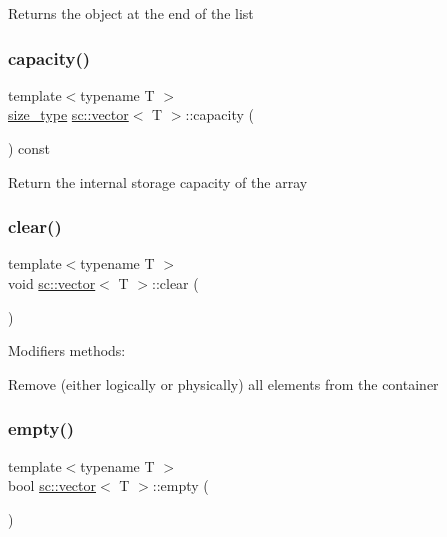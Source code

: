 Returns the object at the end of the list \mbox{\label{classsc_1_1vector_a318c4ab34bd9605214e99db94c4258a9}} 
\subsubsection{\texorpdfstring{capacity()}{capacity()}}
{\footnotesize\ttfamily template$<$typename T $>$ \\
\hyperlink{classsc_1_1vector_a48bf37ba1a6d0c13504414d86e27c399}{size\+\_\+type} \hyperlink{classsc_1_1vector}{sc\+::vector}$<$ T $>$\+::capacity (\begin{DoxyParamCaption}{ }\end{DoxyParamCaption}) const\hspace{0.3cm}{\ttfamily [inline]}}

Return the internal storage capacity of the array \mbox{\label{classsc_1_1vector_a17c6d622cf64278d03feac9c38fa3684}} 
\subsubsection{\texorpdfstring{clear()}{clear()}}
{\footnotesize\ttfamily template$<$typename T $>$ \\
void \hyperlink{classsc_1_1vector}{sc\+::vector}$<$ T $>$\+::clear (\begin{DoxyParamCaption}{ }\end{DoxyParamCaption})\hspace{0.3cm}{\ttfamily [inline]}}



Modifiers methods\+: 

Remove (either logically or physically) all elements from the container \mbox{\label{classsc_1_1vector_a74d59d93240b308c7b4409af489bc3c5}} 
\subsubsection{\texorpdfstring{empty()}{empty()}}
{\footnotesize\ttfamily template$<$typename T $>$ \\
bool \hyperlink{classsc_1_1vector}{sc\+::vector}$<$ T $>$\+::empty (\begin{DoxyParamCaption}{ }\end{DoxyParamCaption})\hspace{0.3cm}{\ttfamily [inline]}}

